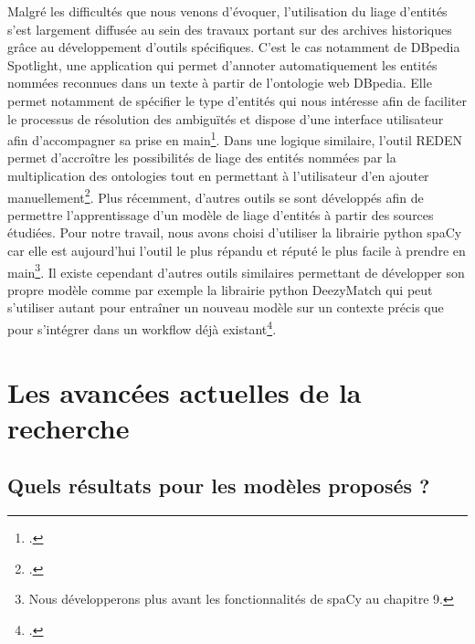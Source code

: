 \documentclass[a4paper,12pt,twoside]{book}
\begin{document}
	Malgré les difficultés que nous venons d'évoquer, l'utilisation du liage d'entités s'est largement diffusée au sein des travaux portant sur des archives historiques grâce au développement d'outils spécifiques. C'est le cas notamment de DBpedia Spotlight, une application qui permet d'annoter automatiquement les entités nommées reconnues dans un texte à partir de l'ontologie web DBpedia. Elle permet notamment de spécifier le type d'entités qui nous intéresse afin de faciliter le processus de résolution des ambiguïtés et dispose d'une interface utilisateur afin d'accompagner sa prise en main\footcite{mendes_dbpedia_2011}. Dans une logique similaire, l'outil REDEN permet d'accroître les possibilités de liage des entités nommées par la multiplication des ontologies tout en permettant à l'utilisateur d'en ajouter manuellement\footcite{frontini_domain-adapted_2015}. Plus récemment, d'autres outils se sont développés afin de permettre l'apprentissage d'un modèle de liage d'entités à partir des sources étudiées. Pour notre travail, nous avons choisi d'utiliser la librairie python spaCy car elle est aujourd'hui l'outil le plus répandu et réputé le plus facile à prendre en main\footnote{Nous développerons plus avant les fonctionnalités de spaCy au chapitre 9.}. Il existe cependant d'autres outils similaires permettant de développer son propre modèle comme par exemple la librairie python DeezyMatch qui peut s'utiliser autant pour entraîner un nouveau modèle sur un contexte précis que pour s'intégrer dans un workflow déjà existant\footcite{hosseini_deezymatch_2020}.
	
	\section{Les avancées actuelles de la recherche}
	
	\subsection{Quels résultats pour les modèles proposés ?}
	
\end{document}
